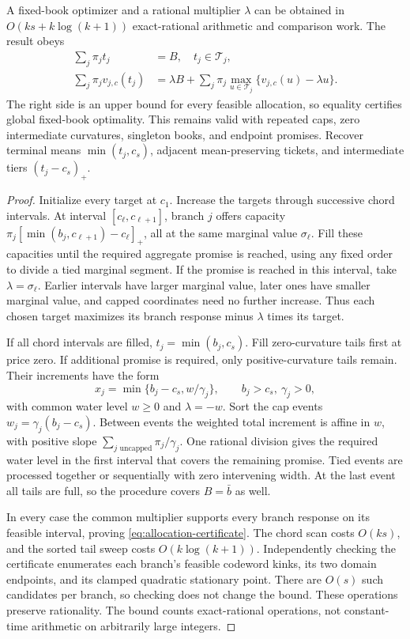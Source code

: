\begin{proposition}\label{prop:allocation-certificate}
A fixed-book optimizer and a rational multiplier $\lambda$ can be obtained in $O(ks+k\log(k+1))$ exact-rational arithmetic and comparison work. The result obeys
\begin{align}\label{eq:allocation-certificate}
 \sum_j\pi_jt_j&=B,\quad t_j\in\mathcal T_j,\nonumber\\
 \sum_j\pi_jv_{j,c}(t_j)
 &=\lambda B+\sum_j\pi_j\max_{u\in\mathcal T_j}
       \{v_{j,c}(u)-\lambda u\}.
\end{align}
The right side is an upper bound for every feasible allocation, so equality certifies global fixed-book optimality. This remains valid with repeated caps, zero intermediate curvatures, singleton books, and endpoint promises. Recover terminal means $\min(t_j,c_s)$, adjacent mean-preserving tickets, and intermediate tiers $(t_j-c_s)_+$.
\end{proposition}
\begin{proof}
Initialize every target at $c_1$. Increase the targets through successive chord intervals. At interval $[c_\ell,c_{\ell+1}]$, branch $j$ offers capacity
$\pi_j[\min(b_j,c_{\ell+1})-c_\ell]_+$, all at the same marginal value $\sigma_\ell$. Fill these capacities until the required aggregate promise is reached, using any fixed order to divide a tied marginal segment. If the promise is reached in this interval, take $\lambda=\sigma_\ell$. Earlier intervals have larger marginal value, later ones have smaller marginal value, and capped coordinates need no further increase. Thus each chosen target maximizes its branch response minus $\lambda$ times its target.

If all chord intervals are filled, $t_j=\min(b_j,c_s)$. Fill zero-curvature tails first at price zero. If additional promise is required, only positive-curvature tails remain. Their increments have the form
\[
 x_j=\min\{b_j-c_s,w/\gamma_j\},\qquad b_j>c_s,\ \gamma_j>0,
\]
with common water level $w\geq0$ and $\lambda=-w$. Sort the cap events $w_j=\gamma_j(b_j-c_s)$. Between events the weighted total increment is affine in $w$, with positive slope $\sum_{j\text{ uncapped}}\pi_j/\gamma_j$. One rational division gives the required water level in the first interval that covers the remaining promise. Tied events are processed together or sequentially with zero intervening width. At the last event all tails are full, so the procedure covers $B=\bar b$ as well.

In every case the common multiplier supports every branch response on its feasible interval, proving \eqref{eq:allocation-certificate}. The chord scan costs $O(ks)$, and the sorted tail sweep costs $O(k\log(k+1))$. Independently checking the certificate enumerates each branch's feasible codeword kinks, its two domain endpoints, and its clamped quadratic stationary point. There are $O(s)$ such candidates per branch, so checking does not change the bound. These operations preserve rationality. The bound counts exact-rational operations, not constant-time arithmetic on arbitrarily large integers.
\end{proof}

